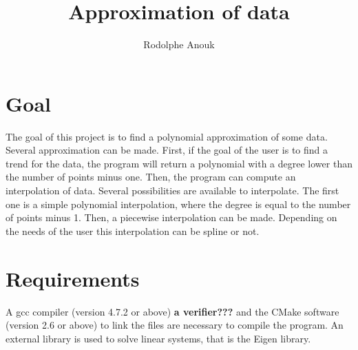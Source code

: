 \documentclass[12pt]{article}
\begin{document}
 
 
 
\title{Approximation of data}%
\author{Rodolphe Anouk}  
\maketitle
 

\section{Goal}
The goal of this project is to find a polynomial approximation of some data. Several approximation can be made. First, if the goal of the user is to find a trend for the data, the program will return a polynomial with a degree lower than the number of points minus one. Then, the program can compute an interpolation of data. Several possibilities are available to interpolate. The first one is a simple polynomial interpolation, where the degree is equal to the number of points minus 1. Then, a piecewise interpolation can be made. Depending on the needs of the user this interpolation can be spline or not.

\section{Requirements}
A gcc compiler (version 4.7.2 or above) \textbf{a verifier???} and the CMake software (version 2.6 or above) to link the files are necessary to compile the program. An external library is used to solve linear systems, that is the Eigen library.
\end{document}
